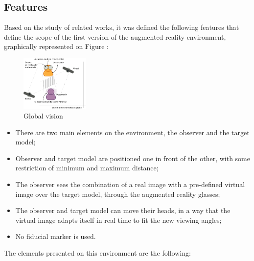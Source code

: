 \documentclass[msc, a4paper, classic, en]{ufbathesis}
\begin{document}
\subsection{Features}

Based on the study of related works, it was defined the following features that define the scope of the first version of the augmented
reality environment, graphically represented on Figure \cite{fig:diagram}:

\begin{figure}
\label{fig:diagram}
\centering
\includegraphics[width=0.3\textwidth]{images/diagram.png}
\caption{Global vision}
\end{figure}

\begin{itemize}
  \item There are two main elements on the environment, the observer and the target model;
  \item Observer and target model are positioned one in front of the other, with some restriction of minimum and maximum distance;
  \item The observer sees the combination of a real image with a pre-defined virtual image over the target model, through the augmented
        reality glasses;
  \item The observer and target model can move their heads, in a way that the virtual image adapts itself in real time to fit the new
        viewing angles;
  \item No fiducial marker is used.
\end{itemize}

The elements presented on this environment are the following:
\end{document}
